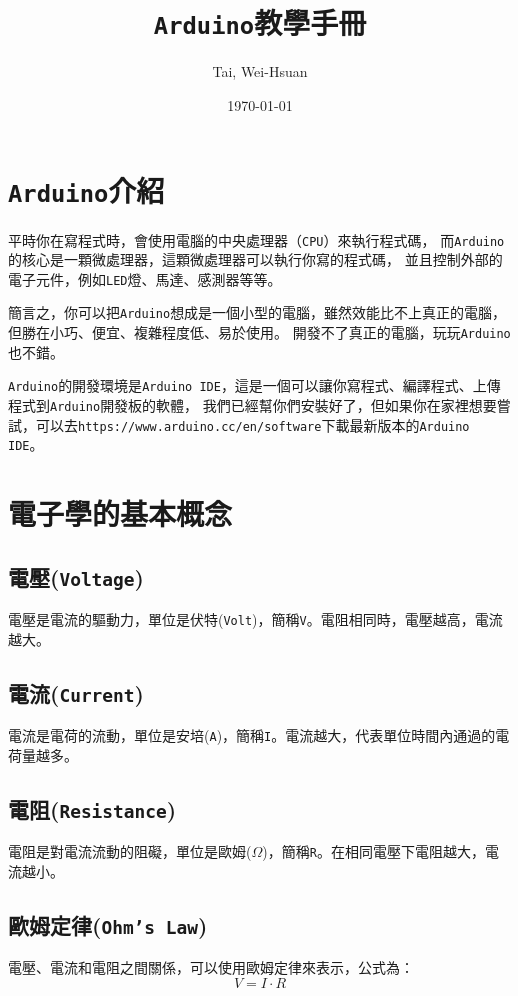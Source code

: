 \documentclass[12pt,a4paper]{article}
\title{\texttt{Arduino}教學手冊}
\author{Tai, Wei-Hsuan}
\date{\today}
\begin{document}
\maketitle

\newpage
\tableofcontents
\newpage

\newpage
\section{\texttt{Arduino}介紹}

平時你在寫程式時，會使用電腦的中央處理器（\texttt{CPU}）來執行程式碼，
而\texttt{Arduino}的核心是一顆微處理器，這顆微處理器可以執行你寫的程式碼，
並且控制外部的電子元件，例如\texttt{LED}燈、馬達、感測器等等。

簡言之，你可以把\texttt{Arduino}想成是一個小型的電腦，雖然效能比不上真正的電腦，但勝在小巧、便宜、複雜程度低、易於使用。
開發不了真正的電腦，玩玩\texttt{Arduino}也不錯。

\texttt{Arduino}的開發環境是\texttt{Arduino IDE}，這是一個可以讓你寫程式、編譯程式、上傳程式到\texttt{Arduino}開發板的軟體，
我們已經幫你們安裝好了，但如果你在家裡想要嘗試，可以去\texttt{https://www.arduino.cc/en/software}下載最新版本的\texttt{Arduino IDE}。

\section{電子學的基本概念}

\subsection{電壓(\texttt{Voltage})}
電壓是電流的驅動力，單位是伏特(\texttt{Volt})，簡稱\texttt{V}。電阻相同時，電壓越高，電流越大。

\subsection{電流(\texttt{Current})}
電流是電荷的流動，單位是安培(\texttt{A})，簡稱\texttt{I}。電流越大，代表單位時間內通過的電荷量越多。

\subsection{電阻(\texttt{Resistance})}
電阻是對電流流動的阻礙，單位是歐姆($\Omega$)，簡稱\texttt{R}。在相同電壓下電阻越大，電流越小。

\subsection{歐姆定律(\texttt{Ohm's Law})}
電壓、電流和電阻之間關係，可以使用歐姆定律來表示，公式為：
$$
V = I \cdot R
$$
\end{document}
